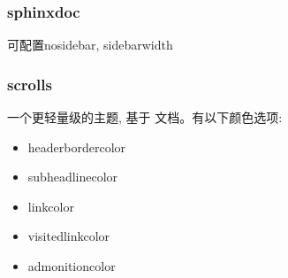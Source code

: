 \documentclass[a4paper,10pt,english]{sphinxmanual}
\begin{document}
\subsubsection{sphinxdoc}
\label{\detokenize{sphinx_conf:sphinxdoc}}
\sphinxAtStartPar
可配置nosidebar, sidebarwidth


\subsubsection{scrolls}
\label{\detokenize{sphinx_conf:scrolls}}
\sphinxAtStartPar
一个更轻量级的主题, 基于  文档。有以下颜色选项:
\begin{itemize}
\item {} 
\sphinxAtStartPar
headerbordercolor

\item {} 
\sphinxAtStartPar
subheadlinecolor

\item {} 
\sphinxAtStartPar
linkcolor

\item {} 
\sphinxAtStartPar
visitedlinkcolor

\item {} 
\sphinxAtStartPar
admonitioncolor

\end{itemize}
\end{document}
